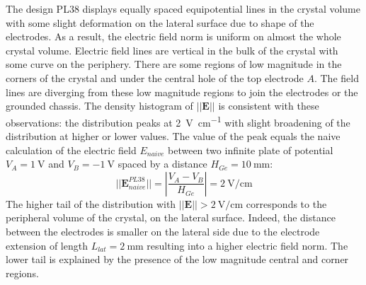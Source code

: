 The design PL38 displays equally spaced equipotential lines in the crystal volume with some slight deformation on the lateral surface due to shape of the electrodes. As a result, the electric field norm is uniform on almost the whole crystal volume. Electric field lines are vertical in the bulk of the crystal with some curve on the periphery. There are some regions of low magnitude in the corners of the crystal and under the central hole of the top electrode $A$. The field lines are diverging from these low magnitude regions to join the electrodes or the grounded chassis. The density histogram of $||\bm{E}||$ is consistent with these observations: the distribution peaks at \SI{2}{\volt\per\cm} with slight broadening of the distribution at higher or lower values. The value of the peak equals the naive calculation of the electric field $E_{naive}$ between two infinite plate of potential $V_A=\SI{+1}{\volt}$ and $V_B=\SI{-1}{\volt}$ spaced by a distance $H_{Ge}=\SI{10}{\mm}$:
\begin{equation}
\label{eq:pl38-naive-efield}
|| \bm{E}_{naive}^{PL38} || = \left| \frac{V_A - V_B}{H_{Ge}} \right| = \SI{2}{\volt\per\cm}
\end{equation}
The higher tail of the distribution with $||\bm{E}||> \SI{2}{\volt\per\cm}$ corresponds to the peripheral volume of the crystal, on the lateral surface. Indeed, the distance between the electrodes is smaller on the lateral side due to the electrode extension of length $L_{lat} = \SI{2}{\mm}$ resulting into a higher electric field norm. The lower tail is explained by the presence of the low magnitude central and corner regions.

